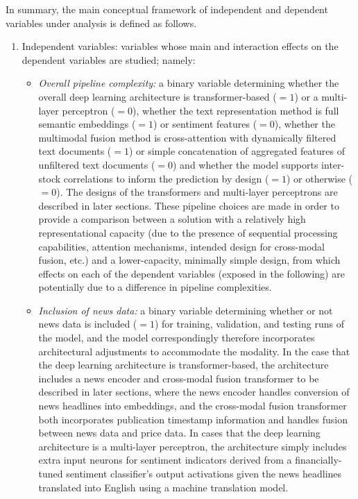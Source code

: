 \documentclass[stu,floatsintext]{apa7}
\begin{document}
In summary, the main conceptual framework of independent and dependent variables under analysis is defined as follows.
\begin{enumerate}
  \item Independent variables: variables whose main and interaction effects on the dependent variables are studied; namely: \begin{itemize}
  \item \textit{Overall pipeline complexity:} a binary variable determining whether the overall deep learning architecture is transformer-based ($=1$) or a multi-layer perceptron ($=0$), whether the text representation method is full semantic embeddings ($=1$) or sentiment features ($=0$), whether the multimodal fusion method is cross-attention with dynamically filtered text documents ($=1$) or simple concatenation of aggregated features of unfiltered text documents ($=0$) and whether the model supports inter-stock correlations to inform the prediction by design ($=1$) or otherwise ($=0$). The designs of the transformers and multi-layer perceptrons are described in later sections. These pipeline choices are made in order to provide a comparison between a solution with a relatively high representational capacity (due to the presence of sequential processing capabilities, attention mechanisms, intended design for cross-modal fusion, etc.) and a lower-capacity, minimally simple design, from which effects on each of the dependent variables (exposed in the following) are potentially due to a difference in pipeline complexities.
    \item \textit{Inclusion of news data:} a binary variable determining whether or not news data is included ($=1$) for training, validation, and testing runs of the model, and the model correspondingly therefore incorporates architectural adjustments to accommodate the  modality. In the case that the deep learning architecture is transformer-based, the architecture includes a news encoder and cross-modal fusion transformer to be described in later sections, where the news encoder handles conversion of news headlines into embeddings, and the cross-modal fusion transformer both incorporates publication timestamp information and handles fusion between news data and price data. In cases that the deep learning architecture is a multi-layer perceptron, the architecture simply includes extra input neurons for sentiment indicators derived from a financially-tuned sentiment classifier's output activations given the news headlines translated into English using a machine translation model.

\end{itemize}
\end{enumerate}
\end{document}
